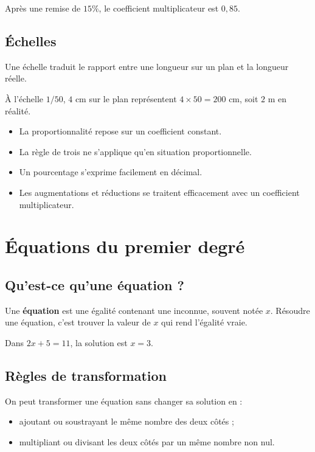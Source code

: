 \documentclass[11pt,a4paper,twoside]{book}
\begin{document}
\begin{exemplebox}
Après une remise de \(15\%\), le coefficient multiplicateur est \(0{,}85\).
\end{exemplebox}

\section{Échelles}
\begin{definitionbox}
Une échelle traduit le rapport entre une longueur sur un plan et la longueur réelle.
\end{definitionbox}

\begin{exemplebox}
À l'échelle \(1/50\), \(4\) cm sur le plan représentent \(4\times 50=200\) cm, soit \(2\) m en réalité.
\end{exemplebox}

\begin{retenirbox}
\begin{itemize}
\item La proportionnalité repose sur un coefficient constant.
\item La règle de trois ne s'applique qu'en situation proportionnelle.
\item Un pourcentage s'exprime facilement en décimal.
\item Les augmentations et réductions se traitent efficacement avec un coefficient multiplicateur.
\end{itemize}
\end{retenirbox}

\chapter{Équations du premier degré}

\section{Qu'est-ce qu'une équation ?}
\begin{definitionbox}
Une \textbf{équation} est une égalité contenant une inconnue, souvent notée \(x\).
Résoudre une équation, c'est trouver la valeur de \(x\) qui rend l'égalité vraie.
\end{definitionbox}

\begin{exemplebox}
Dans \(2x+5=11\), la solution est \(x=3\).
\end{exemplebox}

\section{Règles de transformation}
\begin{methodebox}
On peut transformer une équation sans changer sa solution en :
\begin{itemize}
\item ajoutant ou soustrayant le même nombre des deux côtés ;
\item multipliant ou divisant les deux côtés par un même nombre non nul.
\end{itemize}
\end{methodebox}
\end{document}
